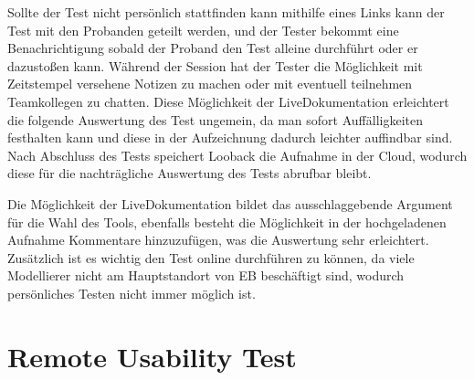 Sollte der Test nicht persönlich stattfinden kann mithilfe eines Links kann der Test mit den Probanden geteilt werden, und der Tester bekommt eine Benachrichtigung sobald der Proband den Test alleine durchführt oder er dazustoßen kann.
Während der Session hat der Tester die Möglichkeit mit Zeitstempel versehene Notizen zu machen oder mit eventuell teilnehmen Teamkollegen zu chatten.
Diese Möglichkeit der Live\-Dokumentation erleichtert die folgende Auswertung des Test ungemein, da man sofort Auffälligkeiten festhalten kann und diese in der Aufzeichnung dadurch leichter auffindbar sind.
Nach Abschluss des Tests speichert Looback die Aufnahme in der Cloud, wodurch diese für die nachträgliche Auswertung des Tests abrufbar bleibt. \cite{.10.01.2020}

Die Möglichkeit der Live\-Dokumentation bildet das ausschlaggebende Argument für die Wahl des Tools, ebenfalls besteht die Möglichkeit in der hochgeladenen Aufnahme Kommentare hinzuzufügen, was die Auswertung sehr erleichtert.
Zusätzlich ist es wichtig den Test online durchführen zu können, da viele Modellierer nicht am Hauptstandort von EB beschäftigt sind, wodurch persönliches Testen nicht immer möglich ist.

\section{ Remote Usability Test}




